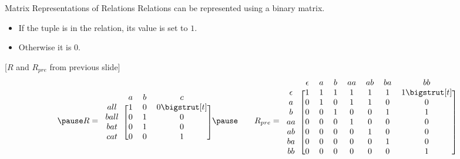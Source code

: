 \begin{slide}[bm=,toc=]{Matrix Representations of Relations}
Relations can be represented using a binary matrix. 

\begin{itemize}
\item<2-> If the tuple is in the relation, its value is set to $1$.
\item<3-> Otherwise it is $0$.
\end{itemize}
\pause[3]
\begin{ex}{}[$R$ and $R_{pre}$ from previous slide]
\[
\pause
R = 
\begin{blockarray}{cccc}
\begin{block}{cccc}
& a & b & c \\
\end{block}
\begin{block}{c[ccc]}
all  & 1 & 0 & 0 \bigstrut[t] \\
ball & 0 & 1 & 0 \\
bat  & 0 & 1 & 0 \\
cat  & 0 & 0 & 1 \\
\end{block}
\end{blockarray}
\pause
\qquad R_{pre} =
\begin{blockarray}{cccccccc}
\begin{block}{cccccccc}
 & \epsilon & a & b & aa & ab & ba & bb \\
\end{block}
\begin{block}{c[ccccccc]}
\epsilon & 1  & 1 & 1 & 1  & 1  & 1  & 1\bigstrut[t] \\
a  & 0& 1 & 0 & 1  & 1  & 0  & 0 \\
b  & 0& 0 & 1 & 0  & 0  & 1  & 1 \\
aa & 0& 0 & 0 & 1  & 0  & 0  & 0 \\
ab & 0& 0 & 0 & 0  & 1  & 0  & 0 \\
ba & 0& 0 & 0 & 0  & 0  & 1  & 0 \\
bb & 0& 0 & 0 & 0  & 0  & 0  & 1 \\
\end{block}
\end{blockarray}
\]
\end{ex}
\end{slide}

